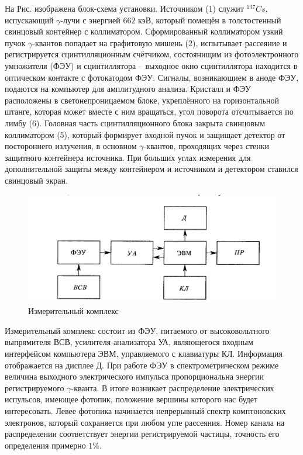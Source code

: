 \documentclass[a4paper, 12pt]{article}
\begin{document}
На Рис. изображена блок-схема установки. Источником (1) служит $^{137}Cs$, испускающий $\gamma$-лучи с энергией $662$ кэВ, который помещён в толстостенный свинцовый контейнер с коллиматором. Сформированный коллиматором узкий пучок $\gamma$-квантов попадает на графитовую мишень (2), испытывает рассеяние и регистрируется сцинтилляционным счётчиком, состоянищим из фотоэлектронного умножителя (ФЭУ) и сцинтиллятора -- выходное окно сцинтиллятора находится в оптическом контакте с фотокатодом ФЭУ. Сигналы, возникающием в аноде ФЭУ, подаются на компьютер для амплитудного анализа. Кристалл и ФЭУ расположены в светонепроницаемом блоке, укреплённого на горизонтальной штанге, которая может вместе с ним вращаться, угол поворота отсчитывается по лимбу (6). Головная часть сцинтилляционного блока закрыта свинцовым коллиматором (5), который формирует входной пучок и защищает детектор от постороннего излучения, в основном $\gamma$-квантов, проходящих через стенки защитного контейнера источника. При больших углах измерения для дополнительной защиты между контейнером и источником и детектором ставился свинцовый экран.
\begin{figure}[H]
    \centering
    \includegraphics[width=1\textwidth]{izmerit.jpg}
    \caption{Измерительный комплекс}
    \label{fig:izm}
\end{figure}
Измерительный комплекс состоит из ФЭУ, питаемого от высоковольтного выпрямителя ВСВ, усилителя-анализатора УА, являющегося входным интерфейсом компьютера ЭВМ, управляемого с клавиатуры КЛ. Информация отображается на дисплее Д. При работе ФЭУ в спектрометрическом режиме величина выходного электрического импульса пропорциональна энергии регистрируемого $\gamma$-кванта. В итоге возникает распределение электрических испульсов, имеющее фотопик, положение вершины которого нас будет интересовать. Левее фотопика начинается непрерывный спектр комптоновских электронов, который сохраняется при любом угле рассеяния. Номер канала на распределении соответствует энергии регистрируемой частицы, точность его определения примерно $1\%$.
\end{document}
